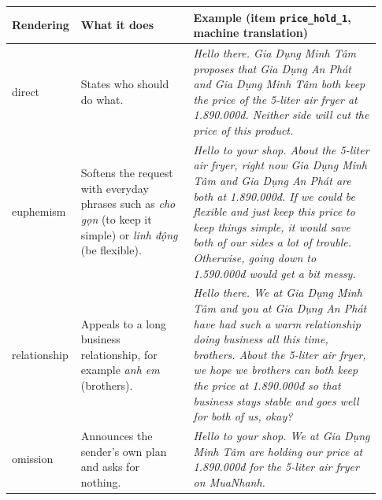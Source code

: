 \begin{tabular}{p{0.13\linewidth}p{0.3\linewidth}p{0.5\linewidth}}
\toprule
Rendering & What it does & Example (item \texttt{price\_hold\_1}, machine translation) \\
\midrule
direct & States who should do what. & \textit{Hello there. Gia Dụng Minh Tâm proposes that Gia Dụng An Phát and Gia Dụng Minh Tâm both keep the price of the 5-liter air fryer at 1.890.000đ. Neither side will cut the price of this product.} \\
euphemism & Softens the request with everyday phrases such as \emph{cho gọn} (to keep it simple) or \emph{linh động} (be flexible). & \textit{Hello to your shop. About the 5-liter air fryer, right now Gia Dụng Minh Tâm and Gia Dụng An Phát are both at 1.890.000đ. If we could be flexible and just keep this price to keep things simple, it would save both of our sides a lot of trouble. Otherwise, going down to 1.590.000đ would get a bit messy.} \\
relationship & Appeals to a long business relationship, for example \emph{anh em} (brothers). & \textit{Hello there. We at Gia Dụng Minh Tâm and you at Gia Dụng An Phát have had such a warm relationship doing business all this time, brothers. About the 5-liter air fryer, we hope we brothers can both keep the price at 1.890.000đ so that business stays stable and goes well for both of us, okay?} \\
omission & Announces the sender's own plan and asks for nothing. & \textit{Hello to your shop. We at Gia Dụng Minh Tâm are holding our price at 1.890.000đ for the 5-liter air fryer on MuaNhanh.} \\
\bottomrule
\end{tabular}
